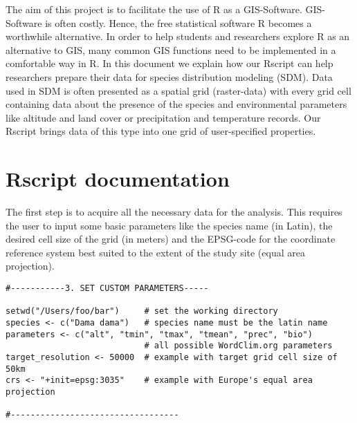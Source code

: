 \documentclass[11pt, a4paper]{article}\usepackage[]{graphicx}\usepackage[]{color}
\begin{document}
The aim of this project is to facilitate the use of R as a GIS-Software. GIS-Software is often costly. Hence, the free statistical software R becomes a worthwhile alternative. In order to help students and researchers explore R as an alternative to GIS, many common GIS functions need to be implemented in a comfortable way in R.\newline
In this document we explain how our Rscript can help researchers prepare their data for species distribution modeling (SDM). Data used in SDM is often presented as a spatial grid (raster-data) with every grid cell containing data about the presence of the species and environmental parameters like altitude and land cover or precipitation and temperature records. Our Rscript brings data of this type into one grid of user-specified properties.

\section{Rscript documentation}%

The first step is to acquire all the necessary data for the analysis. This requires the user to input some basic parameters like the species name (in Latin), the desired cell size of the grid (in meters) and the EPSG-code for the coordinate reference system best suited to the extent of the study site (equal area projection). \newline

\begin{verbatim}
#-----------3. SET CUSTOM PARAMETERS-----

setwd("/Users/foo/bar")     # set the working directory
species <- c("Dama dama")   # species name must be the latin name
parameters <- c("alt", "tmin", "tmax", "tmean", "prec", "bio") 
                            # all possible WordClim.org parameters
target_resolution <- 50000  # example with target grid cell size of 50km
crs <- "+init=epsg:3035"    # example with Europe's equal area projection

#----------------------------------
\end{verbatim}
\end{document}

